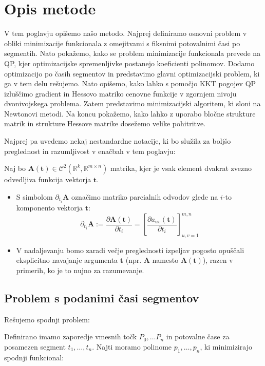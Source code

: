 \documentclass[mat2, tisk]{fmfdelo}
\begin{document}
\section{Opis metode}
\label{sec:opis_metode}

V tem poglavju opišemo našo metodo. Najprej definiramo osnovni problem v obliki minimizacije funkcionala z omejitvami s fiksnimi potovalnimi časi po segmentih. Nato pokažemo, kako se problem minimizacije funkcionala prevede na QP, kjer optimizacijske spremenljivke postanejo koeficienti polinomov. Dodamo optimizacijo po časih segmentov in predstavimo glavni optimizacijski problem, ki ga v tem delu rešujemo. Nato opišemo, kako lahko s pomočjo KKT pogojev QP izluščimo gradient in Hessovo matriko cenovne funkcije v zgornjem nivoju dvonivojskega problema. Zatem predstavimo minimizacijski algoritem, ki sloni na Newtonovi metodi. Na koncu pokažemo, kako lahko z uporabo bločne strukture matrik in strukture Hessove matrike dosežemo velike pohitritve. 

Najprej pa uvedemo nekaj nestandardne notacije, ki bo služila za boljšo preglednost in razumljivost v enačbah v tem poglavju:

Naj bo $\mathbf{A}(\mathbf{t}) \in \mathcal{C}^2(\mathbb{R}^k, \mathbb{R}^{m\times n})$ matrika, kjer je vsak element dvakrat zvezno odvedljiva funkcija vektorja $\mathbf{t}$.
\begin{itemize}
    \item S simbolom $\partial_{t_i} \mathbf{A}$ označimo matriko parcialnih odvodov glede na $i$-to komponento vektorja $\mathbf{t}$:
    \begin{equation} \partial_{t_i} \mathbf{A} := \frac{\partial \mathbf{A}(\mathbf{t})}{\partial t_i} = \left[ \frac{\partial a_{uv}(\mathbf{t})}{\partial t_i} \right]_{u,v=1}^{m,n} \end{equation}
    \item V nadaljevanju bomo zaradi večje preglednosti izpeljav pogosto opuščali eksplicitno navajanje argumenta $\mathbf{t}$ (npr. $\mathbf{A}$ namesto $\mathbf{A}(\mathbf{t})$), razen v primerih, ko je to nujno za razumevanje.
\end{itemize}


\subsection{Problem s podanimi časi segmentov}
Rešujemo spodnji problem:

Definirano imamo zaporedje vmesnih točk $P_0, \ldots P_n$ in potovalne čase za posamezen segment $t_1, \ldots, t_n$. Najti moramo polinome $p_1, \ldots, p_n$, ki minimizirajo spodnji funkcional:
\end{document}
